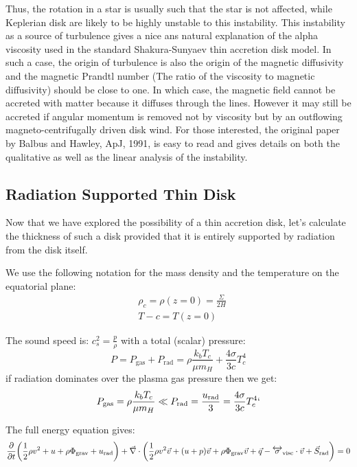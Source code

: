 \documentclass[10pt,a4paper,english]{article}
\let\originalleft\left
\let\originalright\right
\renewcommand{\left}{\mathopen{}\mathclose\bgroup\originalleft}
\renewcommand{\right}{\aftergroup\egroup\originalright}
\begin{document}
Thus, the rotation in a star is usually such that the star is not affected,
while Keplerian disk are likely to be highly unstable  to this instability.
This instability as a source of turbulence gives a  nice ans natural
explanation of the alpha viscosity  used in the standard Shakura-Sunyaev thin
accretion disk model. In such a case,  the origin of turbulence is also the
origin of the magnetic diffusivity and the magnetic Prandtl number (The ratio
of the viscosity to magnetic diffusivity) should be close to one. In which
case, the magnetic field cannot be accreted with matter because it diffuses
through the lines. However it may still be accreted if angular momentum is
removed not by viscosity but by an outflowing  magneto-centrifugally driven
disk wind. For those interested, the original paper by Balbus and Hawley, ApJ,
1991, is easy to read and gives details on both the qualitative as well as the
linear analysis of the instability.

\subsection{Radiation Supported Thin Disk}

Now that we have explored the possibility of a thin accretion disk, let's
calculate the thickness of such a disk provided that it is entirely supported
by radiation from the disk itself.

We use the following notation for the mass density and the temperature on the
equatorial plane:
\begin{align}
    & \rho_c = \rho(z=0) = \frac{\Sigma}{2H} \\
       & T-c = T(z=0)
\end{align}

The sound speed is: $c_s^2 = \frac{p}{\rho}$ with a total (scalar) pressure:
\begin{equation}
    P = P_\mathrm{gas} + P_\mathrm{rad}  = \rho \frac{k_b T_c}{\mu m_H} + \frac{4\sigma}{3 c}T_c^4
\end{equation}
if radiation dominates over the plasma gas pressure then we get:
\begin{equation}
    P_\mathrm{gas} = \rho \frac{k_b T_c}{\mu m_H} \ll P_\mathrm{rad} = \frac{u_\mathrm{rad}}{3} = \frac{4\sigma}{3 c}T_c^4`
\end{equation}

The full energy equation gives:
\begin{equation}
    \frac{\partial}{\partial t } \left(
    \frac{1}{2}\rho v^2 + u + \rho \Phi_\mathrm{grav} + u_\mathrm{rad} \right) +
    \vec{\nabla}\cdot\left(
    \frac{1}{2}\rho v^2 \vec{v} + (u + p)\vec{v} + \rho \Phi_\mathrm{grav}\vec{v} +
    \vec{q} - \tens{\sigma}_\mathrm{visc}\cdot\vec{v} + \vec{S}_\mathrm{rad}
    \right) = 0
\end{equation}
\end{document}
